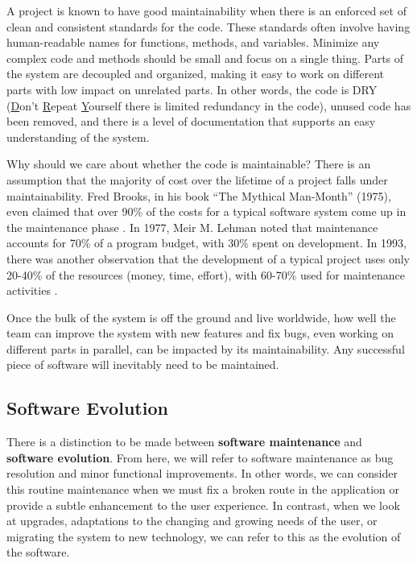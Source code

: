 A project is known to have good maintainability when there is an enforced set of clean and consistent standards for the code. These standards often involve having human-readable names for functions, methods, and variables. Minimize any complex code and methods should be small and focus on a single thing. Parts of the system are decoupled and organized, making it easy to work on different parts with low impact on unrelated parts. In other words, the code is DRY (\underline{D}on't \underline{R}epeat \underline{Y}ourself \textemdash there is limited redundancy in the code), unused code has been removed, and there is a level of documentation that supports an easy understanding of the system.


Why should we care about whether the code is maintainable? There is an assumption that the majority of cost over the lifetime of a project falls under maintainability. Fred Brooks, in his book ``The Mythical Man-Month'' (1975), even claimed that over 90\% of the costs for a typical software system come up in the maintenance phase \cite{brooks:mythical}. In 1977, Meir M. Lehman noted that maintenance accounts for 70\% of a program budget, with 30\% spent on development. In 1993, there was another observation that the development of a typical project uses only 20-40\% of the resources (money, time, effort), with 60-70\% used for maintenance activities \cite{ieee:1219}.

Once the bulk of the system is off the ground and live worldwide, how well the team can improve the system with new features and fix bugs, even working on different parts in parallel, can be impacted by its maintainability. Any successful piece of software will inevitably need to be maintained.

\subsection{Software Evolution} \label{subSoftwareEvolution}

There is a distinction to be made between \textbf{software maintenance} and \textbf{software evolution}. From here, we will refer to software maintenance as bug resolution and minor functional improvements. In other words, we can consider this routine maintenance when we must fix a broken route in the application or provide a subtle enhancement to the user experience. In contrast, when we look at upgrades, adaptations to the changing and growing needs of the user, or migrating the system to new technology, we can refer to this as the evolution of the software.

